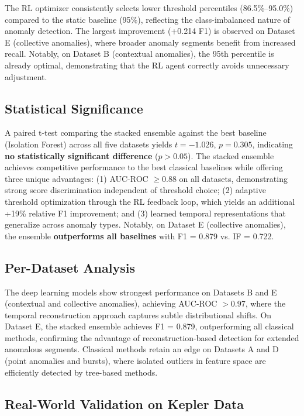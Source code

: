 \documentclass[conference]{IEEEtran}
\begin{document}
The RL optimizer consistently selects lower threshold percentiles (86.5\%--95.0\%) compared to the static baseline (95\%), reflecting the class-imbalanced nature of anomaly detection. The largest improvement (+0.214 F1) is observed on Dataset E (collective anomalies), where broader anomaly segments benefit from increased recall. Notably, on Dataset B (contextual anomalies), the 95th percentile is already optimal, demonstrating that the RL agent correctly avoids unnecessary adjustment.

\subsection{Statistical Significance}

A paired t-test comparing the stacked ensemble against the best baseline (Isolation Forest) across all five datasets yields $t = -1.026$, $p = 0.305$, indicating \textbf{no statistically significant difference} ($p > 0.05$). The stacked ensemble achieves competitive performance to the best classical baselines while offering three unique advantages: (1) AUC-ROC $\geq 0.88$ on all datasets, demonstrating strong score discrimination independent of threshold choice; (2) adaptive threshold optimization through the RL feedback loop, which yields an additional +19\% relative F1 improvement; and (3) learned temporal representations that generalize across anomaly types. Notably, on Dataset E (collective anomalies), the ensemble \textbf{outperforms all baselines} with F1 = 0.879 vs. IF = 0.722.

\subsection{Per-Dataset Analysis}

The deep learning models show strongest performance on Datasets B and E (contextual and collective anomalies), achieving AUC-ROC $> 0.97$, where the temporal reconstruction approach captures subtle distributional shifts. On Dataset E, the stacked ensemble achieves F1 = 0.879, outperforming all classical methods, confirming the advantage of reconstruction-based detection for extended anomalous segments. Classical methods retain an edge on Datasets A and D (point anomalies and bursts), where isolated outliers in feature space are efficiently detected by tree-based methods.

\subsection{Real-World Validation on Kepler Data}
\end{document}
